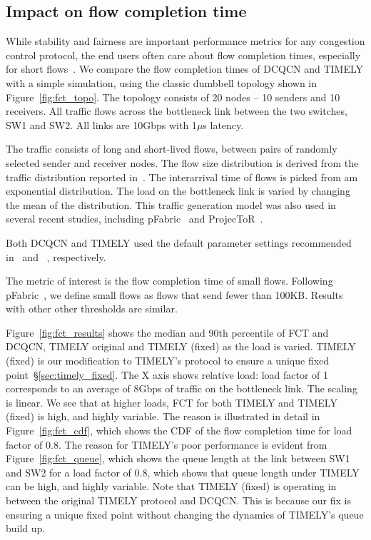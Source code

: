 \subsection {Impact on flow completion time}
\label{sec:fct}

While stability and fairness are important performance metrics for any
congestion control protocol, the end users often care about flow completion
times, especially for short flows~\cite{rcp}. We compare the flow completion 
times of DCQCN and TIMELY with 
a simple simulation, using the classic dumbbell topology shown in
Figure~\ref{fig:fct_topo}. The topology consists of 20 nodes -- 10 senders and
10 receivers. All traffic flows across the bottleneck link between the two
switches, SW1 and SW2. All links are 10Gbps with 1$\mu$s latency.

The traffic consists  of long and short-lived flows, between pairs of randomly
selected sender and receiver nodes. The flow size distribution is derived from
the traffic distribution reported in~\cite{dctcp}. The interarrival time of
flows is picked from am exponential distribution. The load on the bottleneck
link is varied by changing the mean of the distribution. This traffic generation
model was also used in several recent studies, including pFabric~\cite{pfabric}
and ProjecToR~\cite{projector}. 

Both DCQCN and TIMELY used the default parameter settings recommended
in~\cite{dcqcn} and ~\cite{timely}, respectively. 

The metric of interest is the flow completion time of small flows. Following pFabric~\cite{pfabric}, we define small flows as flows that send fewer than 100KB. Results with other other
thresholds are similar.

Figure~\ref{fig:fct_results} shows the median and 90th percentile of FCT and
DCQCN, TIMELY original and TIMELY (fixed) as the load is varied. TIMELY (fixed) is our modification to TIMELY's protocol to ensure a unique fixed point~\S\ref{sec:timely_fixed}. The X axis shows relative load: load factor of 1 corresponds to an average of 8Gbps of traffic on the bottleneck link. The scaling is linear. We see that at higher loads, FCT for both TIMELY and TIMELY (fixed) is high, and highly variable. The reason is illustrated in detail in Figure~\ref{fig:fct_cdf}, which shows the CDF of the flow completion time for
load factor of 0.8. The reason for TIMELY's poor performance is evident from
Figure~\ref{fig:fct_queue}, which shows the queue length at the link between
SW1 and SW2 for a load factor of 0.8, which shows that queue length under TIMELY
can be high, and highly variable. Note that TIMELY (fixed) is operating in between the original TIMELY protocol and DCQCN. This is because our fix is ensuring a unique fixed point without changing the dynamics of TIMELY's queue build up. 

